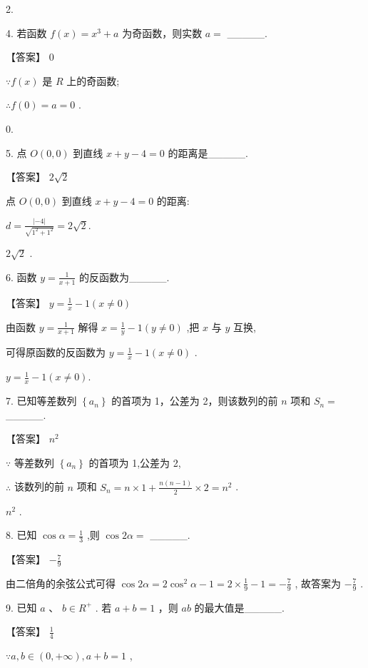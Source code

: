 \documentclass[10pt]{article}
\begin{document}
2.

4. 若函数 \(f\left( x\right)  = {x}^{3} + a\) 为奇函数，则实数 \(a =\) \_\_\_\_\_.

【答案】 0

\(\because f\left( x\right)\) 是 \(R\) 上的奇函数;

\(\therefore f\left( 0\right)  = a = 0\) .

0.

5. 点 \(O\left( {0,0}\right)\) 到直线 \(x + y - 4 = 0\) 的距离是\_\_\_\_\_.

【答案】 \(2\sqrt{2}\)

点 \(O\left( {0,0}\right)\) 到直线 \(x + y - 4 = 0\) 的距离:

\(d = \frac{\left| -4\right| }{\sqrt{{1}^{2} + {1}^{2}}} = 2\sqrt{2}.\)

\(2\sqrt{2}\) .

6. 函数 \(y = \frac{1}{x + 1}\) 的反函数为\_\_\_\_\_.

【答案】 \(y = \frac{1}{x} - 1\left( {x \neq  0}\right)\)

由函数 \(y = \frac{1}{x + 1}\) 解得 \(x = \frac{1}{y} - 1\left( {y \neq  0}\right)\) ,把 \(x\) 与 \(y\) 互换,

可得原函数的反函数为 \(y = \frac{1}{x} - 1\left( {x \neq  0}\right)\) .

\(y = \frac{1}{x} - 1\left( {x \neq  0}\right) .\)

7. 已知等差数列 \(\left\{  {a}_{n}\right\}\) 的首项为 1，公差为 2，则该数列的前 \(n\) 项和 \({S}_{n} =\) \_\_\_\_\_.

【答案】 \({n}^{2}\)

\(\because\) 等差数列 \(\left\{  {a}_{n}\right\}\) 的首项为 1,公差为 2,

\(\therefore\) 该数列的前 \(n\) 项和 \({S}_{n} = n \times  1 + \frac{n\left( {n - 1}\right) }{2} \times  2 = {n}^{2}\) .

\({n}^{2}\) .

8. 已知 \(\cos \alpha  = \frac{1}{3}\) ,则 \(\cos {2\alpha } =\) \_\_\_\_\_.

【答案】 \(- \frac{7}{9}\)

由二倍角的余弦公式可得 \(\cos {2\alpha } = 2{\cos }^{2}\alpha  - 1 = 2 \times  \frac{1}{9} - 1 =  - \frac{7}{9}\) , 故答案为 \(- \frac{7}{9}\) .

9. 已知 \(a\text{ 、 }b \in  {R}^{ + }\) . 若 \(a + b = 1\) ，则 \({ab}\) 的最大值是\_\_\_\_\_.

【答案】 \(\frac{1}{4}\)

\(\because a,b \in  \left( {0, + \infty }\right) ,a + b = 1\) ,
\end{document}
